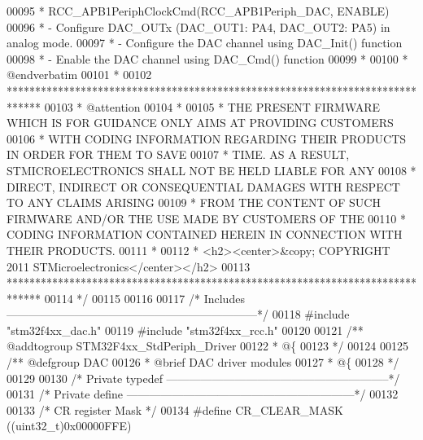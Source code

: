 \begin{DoxyCode}
00095 \textcolor{comment}{  *              RCC\_APB1PeriphClockCmd(RCC\_APB1Periph\_DAC, ENABLE)}
00096 \textcolor{comment}{  *            - Configure DAC\_OUTx (DAC\_OUT1: PA4, DAC\_OUT2: PA5) in analog mode.}
00097 \textcolor{comment}{  *            - Configure the DAC channel using DAC\_Init() function}
00098 \textcolor{comment}{  *            - Enable the DAC channel using DAC\_Cmd() function}
00099 \textcolor{comment}{  * }
00100 \textcolor{comment}{  *  @endverbatim}
00101 \textcolor{comment}{  *    }
00102 \textcolor{comment}{  ******************************************************************************}
00103 \textcolor{comment}{  * @attention}
00104 \textcolor{comment}{  *}
00105 \textcolor{comment}{  * THE PRESENT FIRMWARE WHICH IS FOR GUIDANCE ONLY AIMS AT PROVIDING CUSTOMERS}
00106 \textcolor{comment}{  * WITH CODING INFORMATION REGARDING THEIR PRODUCTS IN ORDER FOR THEM TO SAVE}
00107 \textcolor{comment}{  * TIME. AS A RESULT, STMICROELECTRONICS SHALL NOT BE HELD LIABLE FOR ANY}
00108 \textcolor{comment}{  * DIRECT, INDIRECT OR CONSEQUENTIAL DAMAGES WITH RESPECT TO ANY CLAIMS ARISING}
00109 \textcolor{comment}{  * FROM THE CONTENT OF SUCH FIRMWARE AND/OR THE USE MADE BY CUSTOMERS OF THE}
00110 \textcolor{comment}{  * CODING INFORMATION CONTAINED HEREIN IN CONNECTION WITH THEIR PRODUCTS.}
00111 \textcolor{comment}{  *}
00112 \textcolor{comment}{  * <h2><center>&copy; COPYRIGHT 2011 STMicroelectronics</center></h2>}
00113 \textcolor{comment}{  ******************************************************************************  }
00114 \textcolor{comment}{  */}
00115 
00116 
00117 \textcolor{comment}{/* Includes ------------------------------------------------------------------*/}
00118 \textcolor{preprocessor}{#}\textcolor{preprocessor}{include} "stm32f4xx_dac.h"
00119 \textcolor{preprocessor}{#}\textcolor{preprocessor}{include} "stm32f4xx_rcc.h"
00120 
00121 \textcolor{comment}{/** @addtogroup STM32F4xx\_StdPeriph\_Driver}
00122 \textcolor{comment}{  * @\{}
00123 \textcolor{comment}{  */}
00124 
00125 \textcolor{comment}{/** @defgroup DAC }
00126 \textcolor{comment}{  * @brief DAC driver modules}
00127 \textcolor{comment}{  * @\{}
00128 \textcolor{comment}{  */}
00129 
00130 \textcolor{comment}{/* Private typedef -----------------------------------------------------------*/}
00131 \textcolor{comment}{/* Private define ------------------------------------------------------------*/}
00132 
00133 \textcolor{comment}{/* CR register Mask */}
00134 \textcolor{preprocessor}{#}\textcolor{preprocessor}{define} \textcolor{preprocessor}{CR\_CLEAR\_MASK}              \textcolor{preprocessor}{(}\textcolor{preprocessor}{(}\textcolor{preprocessor}{uint32\_t}\textcolor{preprocessor}{)}0x00000FFE\textcolor{preprocessor}{)}

\end{DoxyCode}
